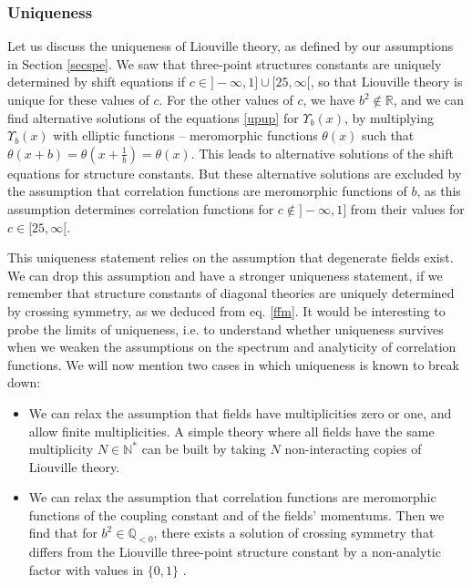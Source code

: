 \documentclass[12pt, a4paper, notitlepage, twoside]{report}
\numberwithin{equation}{section}
\theoremstyle{break}
\begin{document}
\subsubsection{Uniqueness}

Let us discuss the uniqueness of Liouville theory, as defined by our assumptions in Section \ref{secspe}. 
We saw that three-point structures constants are uniquely determined by shift equations if $c\in ]-\infty, 1] \cup [25,\infty[$, so that Liouville theory is unique for these values of $c$. 
For the other values of $c$, we have $b^2\notin\mathbb{R}$, and we can find alternative solutions of the equations \eqref{upup} for $\Upsilon_b(x)$, by multiplying $\Upsilon_b(x)$ with elliptic functions -- meromorphic functions $\theta(x)$ such that $\theta(x+b)=\theta(x+\frac{1}{b}) = \theta(x)$.
This leads to alternative solutions of the shift equations for structure constants.
But these alternative solutions are excluded by the assumption that correlation functions are meromorphic functions of $b$, as this assumption determines correlation functions for $c\notin ]-\infty, 1]$ from their values for $c\in [25,\infty[$.

This uniqueness statement relies on the assumption that degenerate fields exist. We can drop this assumption and have a stronger uniqueness statement, if we remember that structure constants of diagonal theories are uniquely determined by crossing symmetry, as we deduced from eq. \eqref{ffm}. It would be interesting to probe the limits of uniqueness, i.e. to understand whether uniqueness survives when we weaken the assumptions on the spectrum and analyticity of correlation functions. We will now mention two cases in which uniqueness is known to break down:
\begin{itemize}
 \item We can relax the assumption that fields have multiplicities zero or one, and allow finite multiplicities. A simple theory where all fields have the same multiplicity $N\in\mathbb{N}^*$ can be built by taking $N$ non-interacting copies of Liouville theory.
 \item We can relax the assumption that correlation functions are meromorphic functions of the coupling constant and of the fields' momentums. Then we find that for $b^2\in \mathbb{Q}_{<0}$, there exists a solution of crossing symmetry that differs from the Liouville three-point structure constant by a non-analytic factor with values in $\{0,1\}$ \cite{rs15}.
\end{itemize}
\end{document}
